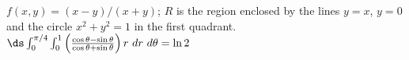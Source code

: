 {$f(x,y) = (x-y)/(x+y)$; $R$ is the region enclosed by the lines $y=x$, $y=0$ and the circle $x^2+y^2=1$ in the first quadrant.
}
{$\ds \int_{0}^{\pi/4}\int_{0}^{1} \left(\frac{\cos\theta-\sin\theta}{\cos\theta+\sin\theta}\right)r\ dr\ d\theta = \ln 2$
}